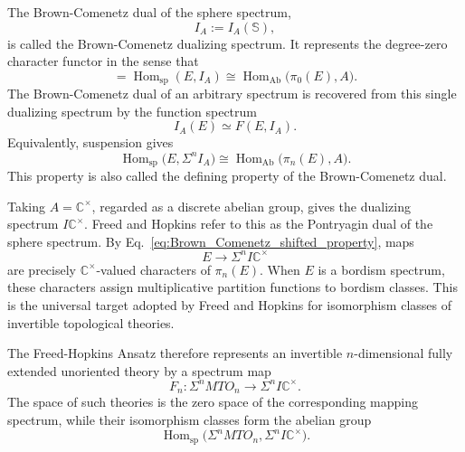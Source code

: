 \documentclass[aps,prx,reprint,superscriptaddress,twocolumn,amsmath,amssymb,amsfonts, nofootinbib]{revtex4-2}
\theoremstyle{apsstyle}
\begin{document}
\noindent The Brown-Comenetz dual of the sphere spectrum,
\begin{equation*}
    I_A:=I_A(\mathbb S),
\end{equation*}
is called the Brown-Comenetz dualizing spectrum. It represents the
degree-zero character functor in the sense that
\begin{equation}
    [E, I_{A}]=\operatorname{Hom}_{\mathrm{sp}}(E,I_A)
    \cong
    \operatorname{Hom}_{\mathrm{Ab}}
    \bigl(\pi_0(E),A\bigr).
    \label{eq:Brown_Comenetz_representing_property}
\end{equation}
The Brown-Comenetz dual of an arbitrary spectrum is recovered from
this single dualizing spectrum by the function spectrum
\begin{equation}
    I_A(E)
    \simeq
    F(E,I_A).
    \label{eq:Brown_Comenetz_function_spectrum}
\end{equation}
Equivalently, suspension gives
\begin{equation}
    \operatorname{Hom}_{\mathrm{sp}}
    \bigl(E,\Sigma^nI_A\bigr)
    \cong
    \operatorname{Hom}_{\mathrm{Ab}}
    \bigl(\pi_n(E),A\bigr).
    \label{eq:Brown_Comenetz_shifted_property}
\end{equation}
This property is also called the defining property of the Brown-Comenetz dual.

\bigskip 

\noindent Taking $A=\mathbb C^\times$, regarded as a discrete abelian group,
gives the dualizing spectrum $I\mathbb C^\times$. Freed and Hopkins
refer to this as the Pontryagin dual of the sphere spectrum. By
Eq.~\eqref{eq:Brown_Comenetz_shifted_property}, maps
\begin{equation*}
    E\longrightarrow\Sigma^nI\mathbb C^\times
\end{equation*}
are precisely $\mathbb C^\times$-valued characters of $\pi_n(E)$.
When $E$ is a bordism spectrum, these characters assign multiplicative
partition functions to bordism classes. This is the universal target adopted by Freed and Hopkins for
isomorphism classes of invertible topological theories.

\noindent The Freed-Hopkins Ansatz therefore represents an invertible
$n$-dimensional fully extended unoriented theory by a spectrum map
\begin{equation}
    F_n:
    \Sigma^nMTO_n
    \longrightarrow
    \Sigma^nI\mathbb C^\times.
    \label{eq:FH_extended_invertible_theory}
\end{equation}
The space of such theories is the zero space of the corresponding
mapping spectrum, while their isomorphism classes form the abelian
group
\begin{equation}
    \operatorname{Hom}_{\mathrm{sp}}
    \bigl(
        \Sigma^nMTO_n,
        \Sigma^nI\mathbb C^\times
    \bigr).
    \label{eq:FH_extended_isomorphism_classes}
\end{equation}
\end{document}
